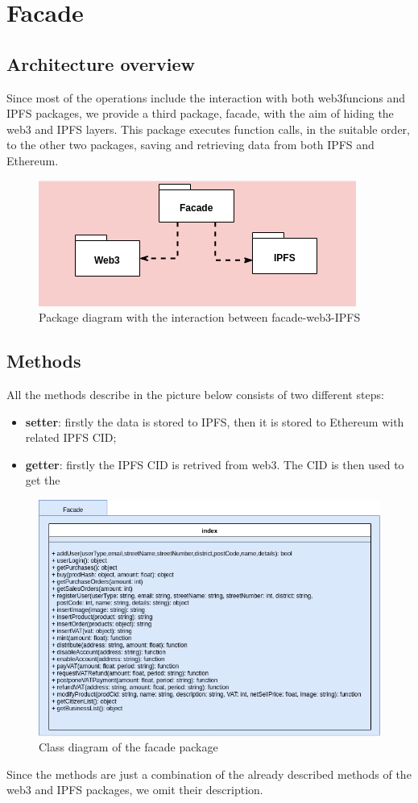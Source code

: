 \section{Facade} 

\subsection{Architecture overview}

Since most of the operations include the interaction with both web3funcions and IPFS packages, we provide a third package, facade, with the aim of hiding the web3 and IPFS layers. This package executes function calls, in the suitable order, to the other two packages, saving and retrieving data from both IPFS and Ethereum.

\begin{figure}[h]
	\centering
	\includegraphics[scale=0.6]{res/images/facade.png}
	\caption{Package diagram with the interaction between facade-web3-IPFS}
\end{figure}

\subsection{Methods}

All the methods describe in the picture below consists of two different steps:
\begin{itemize}
	\item \textbf{setter}: firstly the data is stored to IPFS, then it is stored to Ethereum with related IPFS CID;
	\item \textbf{getter}: firstly the IPFS CID is retrived from web3. The CID is then used to get the 
\end{itemize}
\begin{figure}[h]
	\centering
	\includegraphics[scale=0.57]{res/images/facade-package.png}
	\caption{Class diagram of the facade package}
\end{figure}

Since the methods are just a combination of the already described methods of the web3 and IPFS packages, we omit their description.

